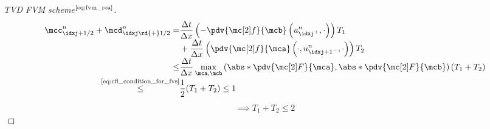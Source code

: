 \begin{proofbox}
\begin{proof}[TVD FVM scheme$^{\text{\cref{eq:fvm_rea}}}$]
\begin{align*}
          \mcc_{\idxj+1/2}^{n}+\mcd_{\idxj\rd{+}1/2}^{n}=&
          \frac{\Delta t}{\Delta x}
          \left(-\pdv{\flux}{\mcb} \left(u_{\idxj^{+}}^{n},\cdot\right)\right)T_{1}\\[-1\jot]
          &+\frac{\Delta t}{\Delta x}\left(\pdv{\flux}{\mca} \left(\cdot,u_{\idxj+1^{-}}^{n},\cdot\right)\right)T_{2}\\[-1\jot]
          \leq&\frac{\Delta t}{\Delta x}\max_{\mca,\mcb}\left(\abs*{\pdv{\Flux}{\mca}},\abs*{\pdv{\Flux}{\mcb}}\right)(T_{1}+T_{2})\\[-1\jot]
          \stackrel{{\text{\cref{eq:cfl_condition_for_fvs}}}}{\leq}&\frac{1}{2}(T_{1}+T_{2})\leq1
        \end{align*}
        \begin{align*}
          \implies T_{1}+T_{2}\leq2
        \end{align*}
    \end{proof}
\end{proofbox}

